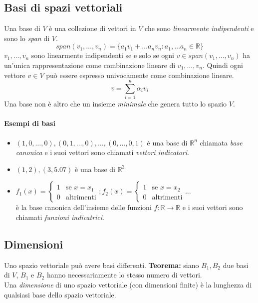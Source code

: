 \documentclass{article}
\begin{document}
        \subsection{Basi di spazi vettoriali}
            Una base di $V$ è una collezione di vettori in $V$ che sono \emph{linearmente indipendenti} e sono lo \emph{span} di $V$.
            \[span(v_1, \dots, v_n) = \{ a_1v_1 + \dots a_nv_n : a_1, \dots a_n \in \mathbb{R} \} \]
            $v_1,\dots,v_n$ sono linearmente indipendenti se e solo se ogni $v \in span(v_1, \dots, v_n)$ ha un'unica rappresentazione
            come combinazione lineare di $v_1, \dots, v_n$. Quindi ogni vettore $v \in V$ può essere espresso univocamente come combinazione 
            lineare.
            \[v = \sum_{i=1}^{n}\alpha_iv_i\]
            Una base non è altro che un insieme \emph{minimale} che genera tutto lo spazio $V$.
            \paragraph{Esempi di basi}
            \begin{itemize}
                \item $(1,0,\dots,0), (0,1,\dots,0), \dots, (0,\dots,0,1)$ è una base di $\mathbb{R}^n$ chiamata \emph{base canonica}
                e i suoi vettori sono chiamati \emph{vettori indicatori}.
                \item $(1,2),(3,5.07)$ è una base di $\mathbb{R}^2$
                \item $f_1(x) = \begin{cases}
                    1 & \text{se }x=x_1 \\
                    0 & \text{altrimenti}
                \end{cases}
                ;
                f_2(x) = \begin{cases}
                    1 & \text{se }x=x_2 \\
                    0 & \text{altrimenti}
                \end{cases}
                \dots$\\
                è la base canonica dell'insieme delle funzioni $f:\mathbb{R} \to \mathbb{R}$ e i suoi vettori sono chiamati \emph{funzioni 
                indicatrici}.
            \end{itemize}
        \subsection{Dimensioni}
            Uno spazio vettoriale può avere basi differenti. \textbf{Teorema:} siano $B_1, B_2$ due basi di $V$, $B_1$ e $B_2$ hanno necessariamente 
            lo stesso numero di vettori. \\
            Una \emph{dimensione} di uno spazio vettoriale (con dimensioni finite) è la lunghezza 
            di qualsiasi base dello spazio vettoriale.
\end{document}
